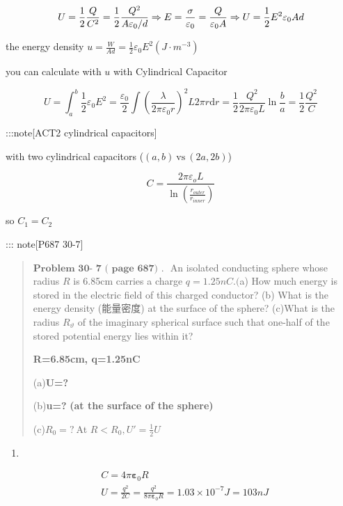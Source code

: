 \documentclass[
]{article}
\providecommand{\tightlist}{%
  \setlength{\itemsep}{0pt}\setlength{\parskip}{0pt}}
\begin{document}
\[
U=\frac{1}{2}\frac{Q}{C^2}=\frac{1}{2}\frac{Q^2}{A\varepsilon _0/d}\Rightarrow E=\frac{\sigma}{\varepsilon_0}=\frac{Q}{\varepsilon _0 A}\\\Rightarrow U=\frac{1}{2}E^2\varepsilon _0 A d
\]

the energy density
\(u=\frac{W}{Ad}=\frac{1}{2}\varepsilon _0 E^2(J\cdot m^{-3})\)

you can calculate with \(u\) with Cylindrical Capacitor

\[
U=\int_{a}^b \frac{1}{2}\varepsilon _0 E^2=\frac{\varepsilon _0}{2}\int \left(\frac{\lambda }{2\pi \varepsilon _0 r} \right)^2L2\pi r \mathrm d r=\frac{1}{2}\frac{Q^2}{2\pi \varepsilon _0 L}\ln \frac{b}{a}=\frac{1}{2}\frac{Q^2}{C}
\]

:::note{[}ACT2 cylindrical capacitors{]}

with two cylindrical capacitors (\((a,b)~\mathrm{vs}~(2a,2b)\))

\[
C=\frac{2\pi\varepsilon_oL}{\ln\left(\frac{r_{outer}}{r_{inner}}\right)}
\]

so \(C_1=C_2\)

::: note{[}P687 30-7{]}

\begin{quote}
\(\textbf{Problem 30- 7 ( page 687) . }\) An isolated conducting sphere
whose radius \(R\) is 6.85cm carries a charge \(q=1.25nC.(\)a) How much
energy is stored in the electric field of this charged conductor? (b)
What is the energy density (能量密度) at the surface of the sphere?
(c)What is the radius \(R_{\vartheta}\) of the imaginary spherical
surface such that one-half of the stored potential energy lies within
it?

\textbf{R=6.85cm, q=1.25nC}

(a)\textbf{U=?}

(b)\textbf{u=?} \textbf{(at the surface of the sphere)}

(c)\(R_0=?~\)At \(R<R_0,U'=\frac{1}{2} U\)
\end{quote}

\begin{enumerate}
\def\labelenumi{(\alph{enumi})}
\tightlist
\item
\end{enumerate}

\[
\begin{aligned}&C=4\pi\boldsymbol{\varepsilon}_0R\\&U=\frac{q^2}{2C}=\frac{q^2}{8\pi\boldsymbol{\varepsilon}_0R}=1.03\times10^{-7}J=103nJ\end{aligned}
\]
\end{document}

